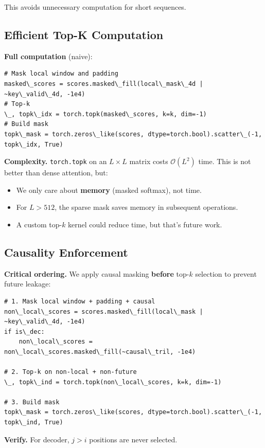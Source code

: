 This avoids unnecessary computation for short sequences.

\subsection{Efficient Top-K Computation}

\textbf{Full computation} (naive):

\begin{lstlisting}
# Mask local window and padding
masked\_scores = scores.masked\_fill(local\_mask\_4d | ~key\_valid\_4d, -1e4)
# Top-k
\_, topk\_idx = torch.topk(masked\_scores, k=k, dim=-1)
# Build mask
topk\_mask = torch.zeros\_like(scores, dtype=torch.bool).scatter\_(-1, topk\_idx, True)
\end{lstlisting}

\textbf{Complexity.} \texttt{torch.topk} on an $L \times L$ matrix costs 
$\mathcal{O}(L^2)$ time. This is not better than dense attention, but:

\begin{itemize}
\item We only care about \textbf{memory} (masked softmax), not time.
\item For $L > 512$, the sparse mask saves memory in subsequent operations.
\item A custom top-$k$ kernel could reduce time, but that's future work.

\end{itemize}
\subsection{Causality Enforcement}

\textbf{Critical ordering.} We apply causal masking \textbf{before} top-$k$ selection 
to prevent future leakage:

\begin{lstlisting}
# 1. Mask local window + padding + causal
non\_local\_scores = scores.masked\_fill(local\_mask | ~key\_valid\_4d, -1e4)
if is\_dec:
    non\_local\_scores = non\_local\_scores.masked\_fill(~causal\_tril, -1e4)

# 2. Top-k on non-local + non-future
\_, topk\_ind = torch.topk(non\_local\_scores, k=k, dim=-1)

# 3. Build mask
topk\_mask = torch.zeros\_like(scores, dtype=torch.bool).scatter\_(-1, topk\_ind, True)
\end{lstlisting}

\textbf{Verify.} For decoder, $j > i$ positions are never selected.

